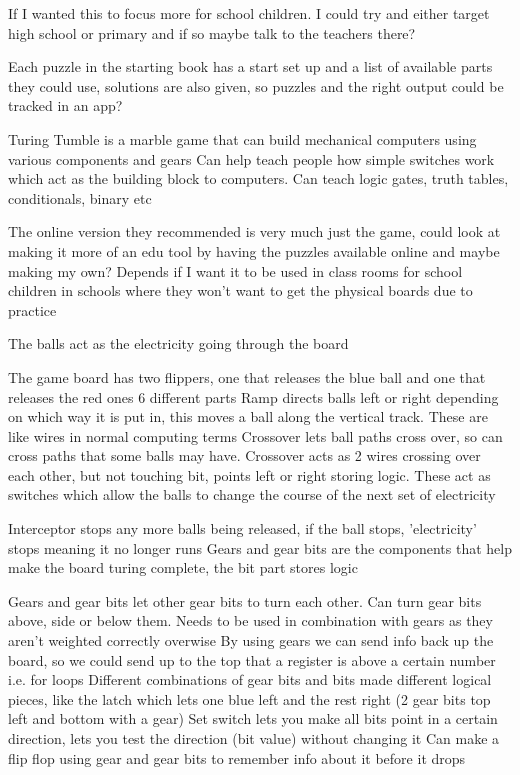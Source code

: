 \documentclass{l4proj}
\begin{document}
If I wanted this to focus more for school children. I could try and either target high school or primary and if so maybe talk to the teachers there?

Each puzzle in the starting book has a start set up and a list of available parts they could use, solutions are also given, so puzzles and the right output could be tracked in an app?


Turing Tumble is a marble game that can build mechanical computers using various components and gears
Can help teach people how simple switches work which act as the building block to computers. Can teach logic gates, truth tables, conditionals, binary etc

The online version they recommended is very much just the game, could look at making it more of an edu tool by having the puzzles available online and maybe making my own?
Depends if I want it to be used in class rooms for school children in schools where they won't want to get the physical boards due to practice

The balls act as the electricity going through the board

The game board has two flippers, one that releases the blue ball and one that releases the red ones
6 different parts
Ramp directs balls left or right depending on which way it is put in, this moves a ball along the vertical track. These are like wires in normal computing terms
Crossover lets ball paths cross over, so can cross paths that some balls may have. Crossover acts as 2 wires crossing over each other, but not touching
bit, points left or right storing logic. These act as switches which allow the balls to change the course of the next set of electricity 

Interceptor stops any more balls being released, if the ball stops, 'electricity' stops meaning it no longer runs
Gears and gear bits are the components that help make the board turing complete, the bit part stores logic 

Gears and gear bits let other gear bits to turn each other. Can turn gear bits above, side or below them. Needs to be used in combination with gears as they aren't weighted correctly overwise
By using gears we can send info back up the board, so we could send up to the top that a register is above a certain number i.e. for loops
Different combinations of gear bits and bits made different logical pieces, like the latch which lets one blue left and the rest right (2 gear bits top left and bottom with a gear)
Set switch lets you make all bits point in a certain direction, lets you test the direction (bit value) without changing it
Can make a flip flop using gear and gear bits to remember info about it before it drops
\end{document}
